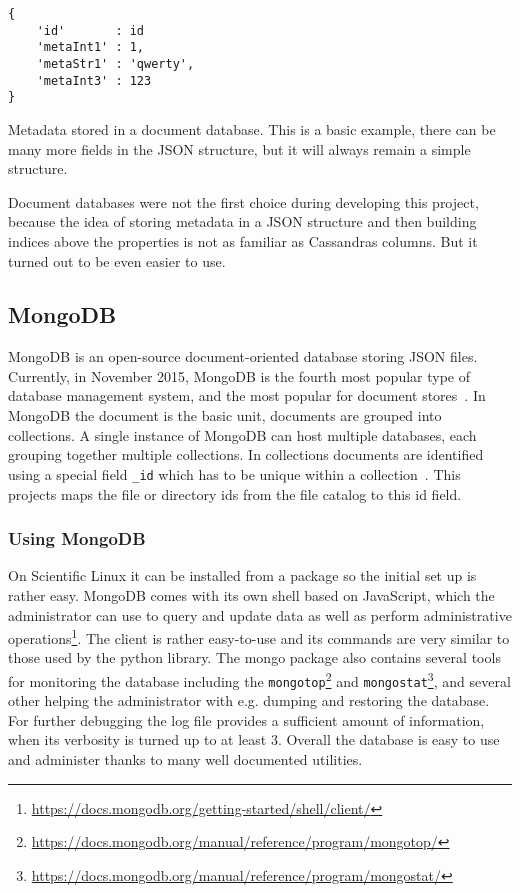 \begin{listing}[t]
\begin{lstlisting}
{
	'id'       : id
	'metaInt1' : 1,
	'metaStr1' : 'qwerty',
	'metaInt3' : 123
}
\end{lstlisting}
\caption{Metadata stored in a document database. This is a basic example, there can be many more fields in the JSON structure, but it will always remain a simple structure.}
\label{lis:json}
\end{listing}

Document databases were not the first choice during developing this project, because the idea of
storing metadata in a JSON structure and then building indices above the properties is not as
familiar as Cassandras columns. But it turned out to be even easier to use.

\subsection{MongoDB}

MongoDB is an open-source document-oriented database storing JSON files. Currently, in November 2015, MongoDB is the fourth 
most popular type of database management system, and the most popular for document stores~\cite{MongoPop}. 
In MongoDB the document is the basic unit, documents are grouped into collections. A single instance of MongoDB can host
multiple databases, each grouping together multiple collections. In collections documents are identified using a special 
field \texttt{\_id} which has to be unique within a collection~\cite{MongoBook}. This projects maps the file or directory 
ids from the file catalog to this id field.

\subsubsection{Using MongoDB}

On Scientific Linux it can be installed from a package so the initial set up is rather easy.
MongoDB comes with its own shell based on
JavaScript, which the administrator can use to query and update data as well as perform administrative 
operations\footnote{\url{https://docs.mongodb.org/getting-started/shell/client/}}. The client is rather easy-to-use 
and its commands are very similar to those used by the python library. The mongo
package also contains several tools for monitoring the database
including the \texttt{mongotop}\footnote{\url{https://docs.mongodb.org/manual/reference/program/mongotop/}} 
and \texttt{mongostat}\footnote{\url{https://docs.mongodb.org/manual/reference/program/mongostat/}}, and several 
other helping the administrator with e.g. dumping and restoring the database. For further 
debugging the log file provides a sufficient amount of information, when its verbosity is turned up to at least 3.
Overall the database is easy to use and administer thanks to many well documented utilities. 

